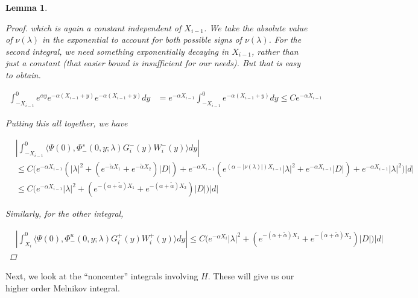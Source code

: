 \documentclass[12pt]{article}
\newtheorem{lemma}{Lemma}
\begin{document}
\begin{lemma}
\begin{proof}
which is again a constant independent of $X_{i-1}$. We take the absolute value of $\nu(\lambda)$ in the exponential to account for both possible signs of $\nu(\lambda)$. For the second integral, we need something exponentially decaying in $X_{i-1}$, rather than just a constant (that easier bound is insufficient for our needs). But that is easy to obtain.

\begin{align*}
\int_{-X_{i-1}}^0 e^{\alpha y} e^{-\alpha(X_{i-1} + y)} e^{-\alpha(X_{i-1} + y)} dy &= e^{-\alpha X_{i-1}} \int_{-X_{i-1}}^0 e^{-\alpha(X_{i-1} + y)} dy \leq C e^{-\alpha X_{i-1}}
\end{align*}

Putting this all together, we have

\begin{align*}
&\left| \int_{-X_{i-1}}^0 \langle \Psi(0), \Phi^s_-(0, y; \lambda) G_i^-(y) W_i^-(y) \rangle dy \right| \\
&\leq C \Big( e^{-\alpha X_{i-1}} (|\lambda|^2 
+ (e^{-\tilde{\alpha} X_1} + e^{-\tilde{\alpha} X_2}) |D|) + e^{-\alpha X_{i-1}} (e^{(\alpha - |\nu(\lambda)|) X_{i-1}} |\lambda|^2 + e^{-\alpha X_{i-1}} |D|) + e^{-\alpha X_{i-1}} |\lambda|^2 \Big) |d| \\
&\leq C \Big( e^{-\alpha X_{i-1}} |\lambda|^2 
+ (e^{-(\alpha + \tilde{\alpha}) X_1} + e^{-(\alpha + \tilde{\alpha}) X_2})|D| \Big) |d|
\end{align*}

Similarly, for the other integral,

\begin{align*}
&\left| \int_{X_i}^0 \langle \Psi(0), \Phi^u_-(0, y; \lambda) G_i^+(y) W_i^+(y) \rangle dy \right| \leq C \Big( e^{-\alpha X_i} |\lambda|^2 + (e^{-(\alpha + \tilde{\alpha}) X_1} + e^{-(\alpha + \tilde{\alpha}) X_2})|D| \Big) |d|
\end{align*}

\end{proof}
\end{lemma}

Next, we look at the ``noncenter'' integrals involving $H$. These will give us our higher order Melnikov integral.

\end{document}
